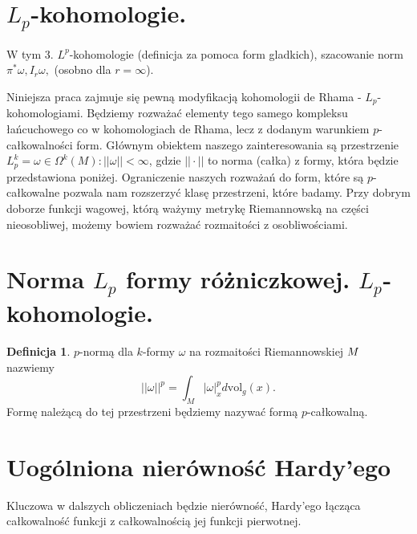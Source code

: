 \documentclass[licencjacka]{pracamgr}
\theoremstyle{definition}
\newtheorem{definition}{Definicja}[section]
\theoremstyle{definition}
\theoremstyle{plain}
\theoremstyle{plain}
\theoremstyle{plain}
\theoremstyle{plain}
\def\M{\ensuremath M}
\begin{document}
\section{$L_p$-kohomologie.}
W tym 
3. $L^p$-kohomologie (definicja za pomoca form gladkich), szacowanie norm
$\pi^*\omega, I_r\omega,$ (osobno dla $r=\infty$).


Niniejsza praca zajmuje się pewną modyfikacją kohomologii de Rhama -
$L_p$-kohomologiami.  Będziemy rozważać elementy tego samego kompleksu
łańcuchowego co w kohomologiach de Rhama, lecz z dodanym warunkiem
$p$-całkowalności form. Głównym obiektem naszego zainteresowania są
przestrzenie 
$L_p^k = {\omega \in \Omega^k(M): ||\omega|| <\infty}$, gdzie $|| \cdot ||$
to norma (całka) z formy, która będzie przedstawiona poniżej. 
Ograniczenie
naszych rozważań do form, które są $p$-całkowalne pozwala nam rozszerzyć
klasę przestrzeni, które badamy. Przy dobrym doborze funkcji wagowej, którą
ważymy metrykę Riemannowską na części nieosobliwej, możemy
bowiem rozważać rozmaitości z osobliwościami.\\

\section{Norma $L_p$ formy różniczkowej. $L_p$-kohomologie.}

\begin{definition}
$p$-normą dla $k$-formy $\omega$ na rozmaitości Riemannowskiej $\M$ nazwiemy
\begin{equation} \label{big-norm}
  || \omega ||^p =  \int_M |\omega|_x^p d \text{vol}_g(x).
\end{equation}
Formę należącą do tej przestrzeni będziemy nazywać formą $p$-całkowalną.
\end{definition}






\section{Uogólniona nierówność Hardy'ego}
Kluczowa w dalszych obliczeniach będzie nierówność, Hardy'ego łącząca całkowalność
funkcji z całkowalnością jej funkcji pierwotnej.
\end{document}
